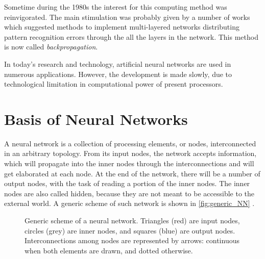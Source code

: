Sometime during the 1980s the interest for this computing method was reinvigorated.
The main stimulation was probably given by a number of works which suggested methods to implement multi-layered networks distributing pattern recognition errors through the all the layers in the network.
This method is now called \textit{backpropagation}.

In today's research and technology, artificial neural networks are used in numerous applications.
However, the development is made slowly, due to technological limitation in computational power of present processors.

\section{Basis of Neural Networks}
\label{sec:Basis_of_Neural_Networks}

A neural network is a collection of processing elements, or nodes, interconnected in an arbitrary topology.
From its input nodes, the network accepts information, which will propagate into the inner nodes through the interconnections and will get elaborated at each node.
At the end of the network, there will be a number of output nodes, with the task of reading a portion of the inner nodes.
The inner nodes are also called hidden, because they are not meant to be accessible to the external world.
A generic scheme of such network is shown in \autoref{fig:generic_NN} .

\begin{figure}[ht]
	\centering
	
	\caption{	Generic scheme of a neural network. %
						Triangles (red) are input nodes, circles (grey) are inner nodes, and squares (blue) are output nodes. %
						Interconnections among nodes are represented by arrows: %
						continuous when both elements are drawn, and dotted otherwise.
						}
	\label{fig:generic_NN}
\end{figure}

